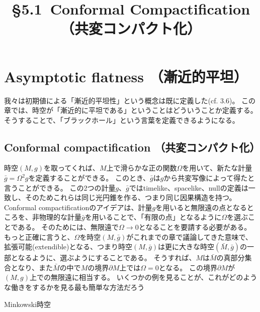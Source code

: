 \documentclass[a4paper, 12pt]{jsarticle}
\title{\S 5.1\ Conformal Compactification （共変コンパクト化）}
\begin{document}
\maketitle

\setcounter{section}{4}
\section{Asymptotic flatness （漸近的平坦）}
我々は初期値による「漸近的平坦性」という概念は既に定義した(cf. 3.6)。
この章では、時空が「漸近的に平坦である」ということはどういうことか定義する。
そうすることで、「ブラックホール」という言葉を定義できるようになる。

\subsection{Conformal compactification （共変コンパクト化）}
時空$(M, g)$を取ってくれば、$M$上で滑らかな正の関数$\Omega$を用いて、新たな計量$\bar{g} = \Omega^2 g$を定義することができる。
このとき、$\bar{g}$は$g$から共変写像によって得たと言うことができる。
この2つの計量$g$、$\bar{g}$ではtimelike、spacelike、nullの定義は一致し、そのためこれらは同じ光円錐を作る、つまり同じ因果構造を持つ。
Conformal compactificationのアイデアは、計量$g$を用いると無限遠の点となるところを、非物理的な計量$\bar{g}$を用いることで、「有限の点」となるように$\Omega$を選ぶことである。
そのためには、無限遠で$\Omega \to 0$となることを要請する必要がある。
もっと正確に言うと、$\Omega$を時空$(M, \bar{g})$がこれまでの章で議論してきた意味で、拡張可能(extendible)となる、つまり時空$(M, \bar{g})$は更に大きな時空$(\bar{M}, \bar{g})$の一部となるように、選ぶようにすることである。
そうすれば、$M$は$\bar{M}$の真部分集合となり、また$\bar{M}$の中で$M$の境界$\partial M$上では$\Omega = 0$となる。
この境界$\partial M$が$(M, g)$上での無限遠に相当する。
いくつかの例を見ることが、これがどのような働きをするかを見る最も簡単な方法だろう

\begin{description}
	\item[Minkowski時空]
\end{description}
\end{document}
